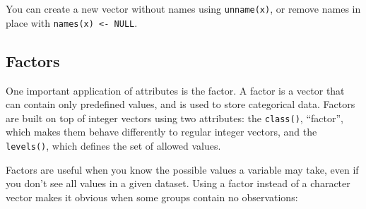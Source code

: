 You can create a new vector without names using \texttt{unname(x)}, or
remove names in place with \texttt{names(x) \textless{}- NULL}.

\subsection{Factors}\label{factors}

One important application of attributes is the factor. A factor is a
vector that can contain only predefined values, and is used to store
categorical data. Factors are built on top of integer vectors using two
attributes: the \texttt{class()}, ``factor'', which makes them behave
differently to regular integer vectors, and the \texttt{levels()}, which
defines the set of allowed values.

\begin{Shaded}
\begin{Highlighting}[]
\StringTok{ }\NormalTok{(}\NormalTok{(}\NormalTok{, }\NormalTok{, }\NormalTok{, }\NormalTok{))}

\NormalTok{x[}\NormalTok{] <-}

\NormalTok{(}\NormalTok{(}\NormalTok{), }\NormalTok{(}\NormalTok{))}
\end{Highlighting}
\end{Shaded}

Factors are useful when you know the possible values a variable may
take, even if you don't see all values in a given dataset. Using a
factor instead of a character vector makes it obvious when some groups
contain no observations:

\begin{Shaded}
\begin{Highlighting}[]
\StringTok{ }\NormalTok{(}\NormalTok{, }\NormalTok{, }\NormalTok{)}
\StringTok{ } \NormalTok{(}\NormalTok{, }\NormalTok{))}

\end{Highlighting}
\end{Shaded}

